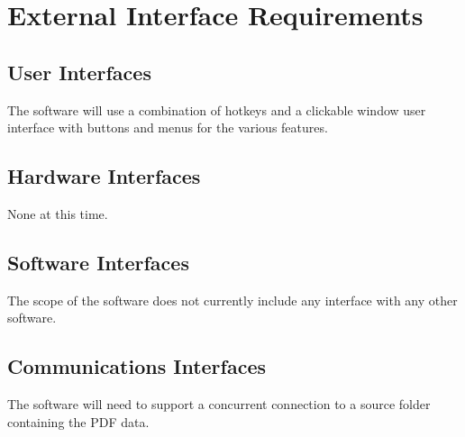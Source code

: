 \section{External Interface Requirements}

\subsection{User Interfaces}
The software will use a combination of hotkeys and a clickable window user interface with buttons and menus for the various features.
\subsection{Hardware Interfaces}
None at this time.
\subsection{Software Interfaces}
The scope of the software does not currently include any interface with any other software.
\subsection{Communications Interfaces}
The software will need to support a concurrent connection to a source folder containing the PDF data.
